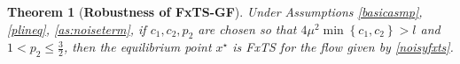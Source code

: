 \documentclass[letterpaper]{article}
\newtheorem{assumption}{Assumption}
\newtheorem{theorem}{Theorem}
\newtheorem{remark}{Remark}
\begin{document}





\begin{theorem}[\textbf{Robustness of FxTS-GF}]\label{thm:Robustness}
Under Assumptions \ref{basicasmp}, \ref{plineq}, \ref{as:noiseterm}, if $c_1, c_2, p_2$ are chosen so that 
$4\mu^2 \min \left\{c_1, c_2 \right\}>l$ and $1<p_2\leq \frac{3}{2}$,
then the equilibrium point $x^\star$ is FxTS for the flow given by \eqref{noisyfxts}.
\end{theorem}
\end{document}
